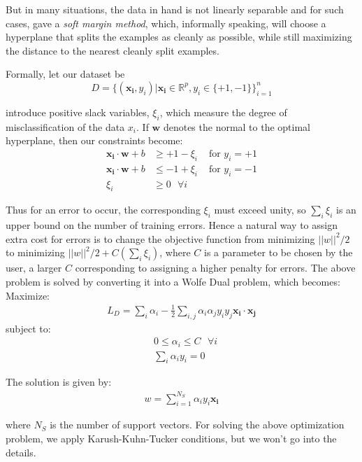But in many situations, the data in hand is not linearly separable and for such cases, \citep{vapnikSVM:95} gave a \textit{soft margin method}, which, informally speaking, will choose a hyperplane that splits the examples as cleanly as possible, while still maximizing the distance to the nearest cleanly split examples.

Formally, let our dataset be 
\begin{equation}
D = \{(\bm{x_i},y_i) | \bm{x_i} \in \mathbb{R}^p, y_i \in \{+1,-1\}\}_{i=1}^{n} 
\end{equation}

\citep{vapnikSVM:95} introduce positive slack variables, $\xi_i$, which measure the degree of misclassification of the data $x_i$. If $\bm{w}$ denotes the normal to the optimal hyperplane, then our constraints become: 
\begin{align}
 \bm{x_i} \cdot \bm{w} + b &\geq +1 - \xi_i & \mbox{ for } y_i = +1\\
 \bm{x_i} \cdot \bm{w} + b &\leq -1 + \xi_i & \mbox{ for } y_i = -1\\
 \xi_i &\geq 0 \mbox{   } \forall i
\end{align}

Thus for an error to occur, the corresponding $\xi_i$ must exceed unity, so $\sum_i \xi_i$ is an upper bound on the number of training errors.
Hence a natural way to assign extra cost for errors is to change the objective function from minimizing $||w||^2/2$ to minimizing $||w||^2/2 + C(\sum_i \xi_i)$,
where $C$ is a parameter to be chosen by the user, a larger $C$ corresponding to assigning a higher penalty for errors.
The above problem is solved by converting it into a Wolfe Dual problem, which becomes: \\

\noindent
Maximize:
\begin{align} \label{eq:SVMWolfeDual}
 L_D = \sum_i \alpha_i - \frac{1}{2} \sum_{i,j} \alpha_i \alpha_j y_i y_j \bm{x_i}\cdot \bm{x_j}
\end{align}
subject to:
\begin{align}
&0 \leq \alpha_i \leq C \mbox{  } \forall i \\
&\sum_i \alpha_i  y_i = 0
\end{align}

\noindent
The solution is given by:
\begin{align}
 w = \sum_{i=1}^{N_S} \alpha_i y_i \bm{x_i}
\end{align}

where $N_S$ is the number of support vectors. 
For solving the above optimization problem, we apply Karush-Kuhn-Tucker conditions, but we won't go into the details.

